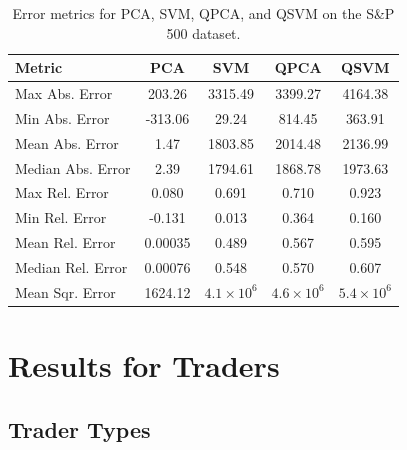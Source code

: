 \documentclass[journal]{IEEEtran}
\begin{document}
\begin{table}[ht!]
    \centering
    \begin{tabular}{|l|c|c|c|c|}
        \hline
        \textbf{Metric} & \textbf{PCA} & \textbf{SVM} & \textbf{QPCA} & \textbf{QSVM} \\
        \hline
        Max Abs. Error & 203.26 & 3315.49 & 3399.27 & 4164.38 \\
        Min Abs. Error & -313.06 & 29.24 & 814.45 & 363.91 \\
        Mean Abs. Error & 1.47 & 1803.85 & 2014.48 & 2136.99 \\
        Median Abs. Error & 2.39 & 1794.61 & 1868.78 & 1973.63 \\
        Max Rel. Error & 0.080 & 0.691 & 0.710 & 0.923 \\
        Min Rel. Error & -0.131 & 0.013 & 0.364 & 0.160 \\
        Mean Rel. Error & 0.00035 & 0.489 & 0.567 & 0.595 \\
        Median Rel. Error & 0.00076 & 0.548 & 0.570 & 0.607 \\
        Mean Sqr. Error & 1624.12 & $4.1 \times 10^6$ & $4.6 \times 10^6$ & $5.4 \times 10^6$ \\
        \hline
    \end{tabular}
    \vspace{1em}
    \caption{Error metrics for PCA, SVM, QPCA, and QSVM on the S\&P 500 dataset.}
    \label{tab:error_metrics}
\end{table}

\section{Results for Traders}

\subsection{Trader Types}
\end{document}
